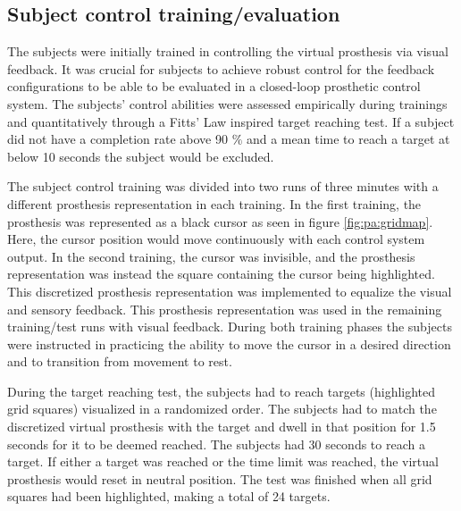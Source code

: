 \subsection{Subject control training/evaluation} \label{sec:pa:subjectcontrol}
The subjects were initially trained in controlling the virtual prosthesis via visual feedback. It was crucial for subjects to achieve robust control for the feedback configurations to be able to be evaluated in a closed-loop prosthetic control system. The subjects' control abilities were assessed empirically during trainings and quantitatively through a Fitts' Law inspired target reaching test. If a subject did not have a completion rate above 90 $\%$ and a mean time to reach a target at below 10 seconds the subject would be excluded. 

The subject control training was divided into two runs of three minutes with a different prosthesis representation in each training. In the first training, the prosthesis was represented as a black cursor as seen in figure \ref{fig:pa:gridmap}. Here, the cursor position would move continuously with each control system output. In the second training, the cursor was invisible, and the prosthesis representation was instead the square containing the cursor being highlighted. This discretized prosthesis representation was implemented to equalize the visual and sensory feedback. This prosthesis representation was used in the remaining training/test runs with visual feedback. During both training phases the subjects were instructed in practicing the ability to move the cursor in a desired direction and to transition from movement to rest. 

During the target reaching test, the subjects had to reach targets (highlighted grid squares) visualized in a randomized order. The subjects had to match the discretized virtual prosthesis with the target and dwell in that position for 1.5 seconds for it to be deemed reached. The subjects had 30 seconds to reach a target. If either a target was reached or the time limit was reached, the virtual prosthesis would reset in neutral position. The test was finished when all grid squares had been highlighted, making a total of 24 targets. 
